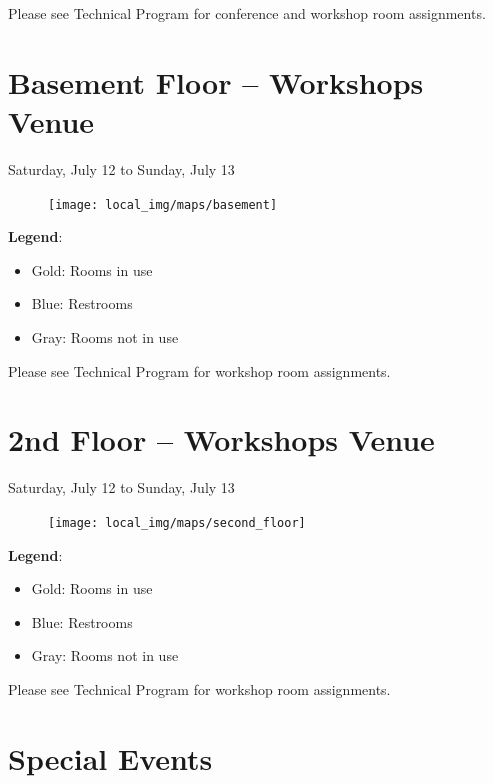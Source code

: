 \vspace{0.3cm}
{\Large Please see Technical Program for conference and workshop room assignments.}

\newpage
{} \section{Basement Floor -- Workshops Venue}
{\large Saturday, July 12 to Sunday, July 13}

\begin{figure}[h!]
\center
\texttt{[image: local\_img/maps/basement]}
\end{figure}

\vspace{0.3cm}

{\Large \textbf{Legend}: 
\begin{itemize}
\itemsep0em 
\item Gold: Rooms in use 
\item Blue: Restrooms
\item Gray: Rooms not in use
\end{itemize}
}

\vspace{0.3cm}
{\Large Please see Technical Program for workshop room assignments.}

\newpage
{} \section{2nd Floor -- Workshops Venue}
{\large Saturday, July 12 to Sunday, July 13}

\begin{figure}[h!]
\center
\texttt{[image: local\_img/maps/second\_floor]}
\end{figure}

\vspace{0.3cm}

{\Large \textbf{Legend}: 
\begin{itemize}
\itemsep0em 
\item Gold: Rooms in use 
\item Blue: Restrooms
\item Gray: Rooms not in use
\end{itemize}
}

\vspace{0.3cm}
{\Large Please see Technical Program for workshop room assignments.}


\newpage
{} \section{Special Events}

